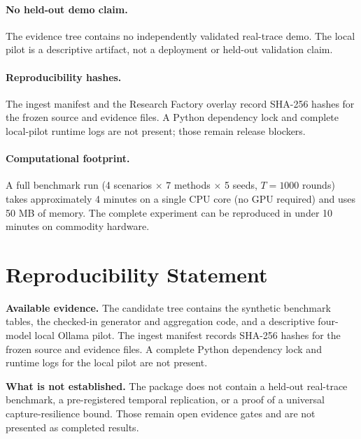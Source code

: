 \documentclass[11pt]{article}
\begin{document}
\paragraph{No held-out demo claim.}
The evidence tree contains no independently validated real-trace demo.
The local pilot is a descriptive artifact, not a deployment or held-out
validation claim.

\paragraph{Reproducibility hashes.}
The ingest manifest and the Research Factory overlay record SHA-256 hashes
for the frozen source and evidence files. A Python dependency lock and
complete local-pilot runtime logs are not present; those remain release
blockers.

\paragraph{Computational footprint.}
A full benchmark run (4 scenarios $\times$ 7 methods $\times$ 5 seeds,
$T=1000$ rounds) takes approximately 4 minutes on a single CPU core
(no GPU required) and uses 50 MB of memory. The complete experiment
can be reproduced in under 10 minutes on commodity hardware.


\section*{Reproducibility Statement}
\label{sec:reproducibility}

\textbf{Available evidence.} The candidate tree contains the synthetic
benchmark tables, the checked-in generator and aggregation code, and a
descriptive four-model local Ollama pilot. The ingest manifest records
SHA-256 hashes for the frozen source and evidence files. A complete Python
dependency lock and runtime logs for the local pilot are not present.

\textbf{What is not established.} The package does not contain a held-out
real-trace benchmark, a pre-registered temporal replication, or a proof of a
universal capture-resilience bound. Those remain open evidence gates and are
not presented as completed results.
\end{document}
